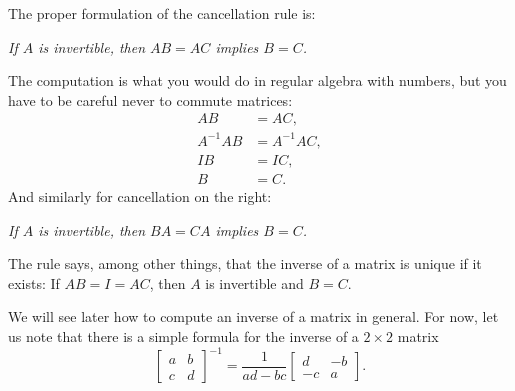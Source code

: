 The proper formulation of the cancellation rule is:
\begin{center}
\emph{If $A$ is invertible,
then
$AB = AC$ implies $B=C$.}
\end{center}
The computation is what you would do in regular algebra with numbers,
but you have to
be careful never to commute matrices:
\begin{align*}
AB & = AC , \\
A^{-1}AB & = A^{-1}AC , \\
IB & = IC , \\
B & = C .
\end{align*}
And similarly for cancellation on the right:
\begin{center}
\emph{If $A$ is invertible,
then $BA = CA$ implies $B=C$.}
\end{center}
The rule says, among other things, that the
inverse of a matrix is unique if it exists:  If $AB = I = AC$, then $A$ is
invertible and $B=C$.

We will see later how to compute an inverse of a matrix
in general.  For now,
let us note that there is a simple formula for the inverse of
a $2 \times 2$ matrix
\begin{equation*}
\begin{bmatrix}
a & b \\
c & d
\end{bmatrix}^{-1}
=
\frac{1}{ad-bc}
\begin{bmatrix}
d & -b \\
-c & a
\end{bmatrix} .
\end{equation*}

